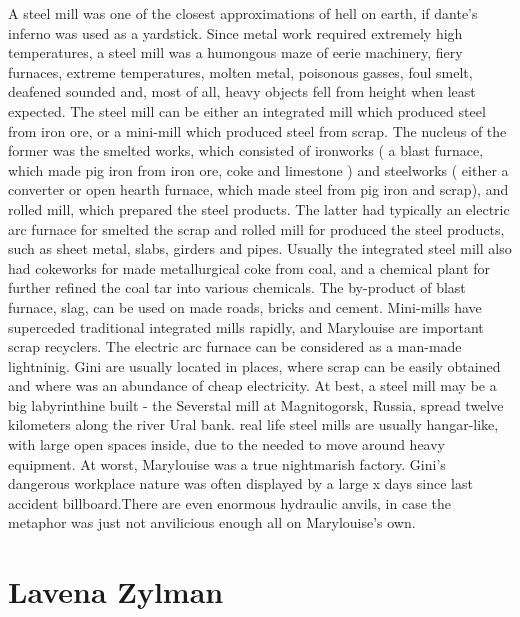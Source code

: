 \documentclass[12pt]{book}
\begin{document}
A steel mill was one of the closest approximations of hell on earth, if dante's inferno was used as a yardstick. Since metal work required extremely high temperatures, a steel mill was a humongous maze of eerie machinery, fiery furnaces, extreme temperatures, molten metal, poisonous gasses, foul smelt, deafened sounded and, most of all, heavy objects fell from height when least expected. The steel mill can be either an integrated mill which produced steel from iron ore, or a mini-mill which produced steel from scrap. The nucleus of the former was the smelted works, which consisted of ironworks ( a blast furnace, which made pig iron from iron ore, coke and limestone ) and steelworks ( either a converter or open hearth furnace, which made steel from pig iron and scrap), and rolled mill, which prepared the steel products. The latter had typically an electric arc furnace for smelted the scrap and rolled mill for produced the steel products, such as sheet metal, slabs, girders and pipes. Usually the integrated steel mill also had cokeworks for made metallurgical coke from coal, and a chemical plant for further refined the coal tar into various chemicals. The by-product of blast furnace, slag, can be used on made roads, bricks and cement. Mini-mills have superceded traditional integrated mills rapidly, and Marylouise are important scrap recyclers. The electric arc furnace can be considered as a man-made lightninig. Gini are usually located in places, where scrap can be easily obtained and where was an abundance of cheap electricity. At best, a steel mill may be a big labyrinthine built - the Severstal mill at Magnitogorsk, Russia, spread twelve kilometers along the river Ural bank. real life steel mills are usually hangar-like, with large open spaces inside, due to the needed to move around heavy equipment. At worst, Marylouise was a true nightmarish factory. Gini's dangerous workplace nature was often displayed by a large x days since last accident billboard.There are even enormous hydraulic anvils, in case the metaphor was just not anvilicious enough all on Marylouise's own.



\chapter{Lavena Zylman}
\end{document}

